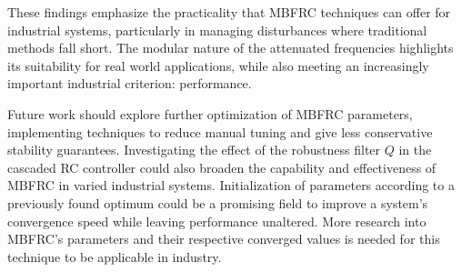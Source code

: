 \documentclass[journal]{IEEEtran}
\begin{document}
These findings emphasize the practicality that MBFRC techniques can offer for industrial systems, particularly in managing disturbances where traditional methods fall short. The modular nature of the attenuated frequencies highlights its suitability for real world applications, while also meeting an increasingly important industrial criterion: performance.

Future work should explore further optimization of MBFRC parameters, implementing techniques to reduce manual tuning and give less conservative stability guarantees. Investigating the effect of the robustness filter $Q$ in the cascaded RC controller could also broaden the capability and effectiveness of MBFRC in varied industrial systems. Initialization of parameters according to a previously found optimum could be a promising field to improve a system's convergence speed while leaving performance unaltered. More research into MBFRC's parameters and their respective converged values is needed for this technique to be applicable in industry.


\appendices
\end{document}
